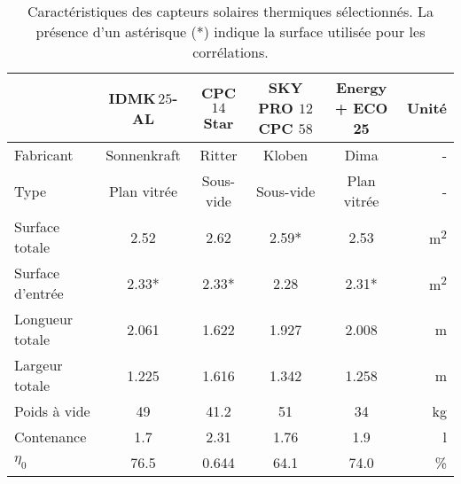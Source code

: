 \begin{table}
\centering
\caption{Caractéristiques des capteurs solaires thermiques sélectionnés. La présence d’un astérisque (*)
         indique la surface utilisée pour les corrélations.}
\label{tab:capteurs_specs_optimisation}
\begin{tabular}{l c c c c r}
    \toprule
                                 & IDMK\,$25$-AL              & CPC $14$ Star            & SKY PRO $12$ CPC $58$      & Energy + ECO 25         & Unité                       \\
    \midrule
    Fabricant                    & Sonnenkraft                & Ritter                   & Kloben                     & Dima                    & -                           \\
    Type                         & Plan vitrée                & Sous-vide                & Sous-vide                  & Plan vitrée             & -                           \\
    \addlinespace[\defaultaddspace]
    Surface totale               & \num{2.52}                 & \num{2.62}               & \num{2.59}*                & \num{2.53}              & \si{\metre\squared}                  \\
    Surface d’entrée             & \num{2.33}*                & \num{2.33}*              & \num{2.28}                 & \num{2.31}*              & \si{\metre\squared}                  \\
    Longueur totale              & \num{2.061}                & \num{1.622}              & \num{1.927}                & \num{2.008}             & \si{\metre}                  \\
    Largeur totale               & \num{1.225}                & \num{1.616}              & \num{1.342}                & \num{1.258}             & \si{\metre}                  \\
    Poids à vide                 & \num{49}                   & \num{41.2}               & \num{51}                   & \num{34}                & \si{kg}                     \\
    Contenance                   & \num{1.7}                  & \num{2.31}               & \num{1.76}                 & \num{1.9}               & \si{\litre}                 \\
    \addlinespace[\defaultaddspace]
    $\eta_{0}$                   & \num{76.5}                 & \num{0.644}              & \num{64.1}                 & \num{74.0}              & \si{\percent}                     \\

\end{tabular}
\end{table}
